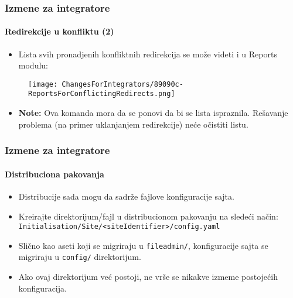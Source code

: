 
\begin{frame}[fragile]
	\frametitle{Izmene za integratore}
	\framesubtitle{Redirekcije u konfliktu (2)}

	\begin{itemize}
		\item Lista svih pronadjenih konfliktnih redirekcija se može videti i u Reports modulu:
	\end{itemize}

	\begin{figure}
		\texttt{[image: ChangesForIntegrators/89090c-ReportsForConflictingRedirects.png]}
	\end{figure}

	\begin{itemize}
		\item
			\small\textbf{Note:}
				Ova komanda mora da se ponovi da bi se lista ispraznila.
				Rešavanje problema (na primer uklanjanjem redirekcije) neće očistiti listu.
			\normalsize
	\end{itemize}

\end{frame}


\begin{frame}[fragile]
	\frametitle{Izmene za integratore}
	\framesubtitle{Distribuciona pakovanja}

	\lstset{basicstyle=\tiny\ttfamily}

	\begin{itemize}
		\item Distribucije sada mogu da sadrže fajlove konfiguracije sajta.

		\item Kreirajte direktorijum/fajl u distribucionom pakovanju na sledeći način:\newline
			\texttt{Initialisation/Site/<siteIdentifier>/config.yaml}

		\item Slično kao aseti koji se migriraju u \texttt{fileadmin/},\newline
			konfiguracije sajta se migriraju u \texttt{config/} direktorijum.

		\item Ako ovaj direktorijum već postoji, ne vrše se nikakve izmeme postojećih konfiguracija.
	\end{itemize}

\end{frame}

